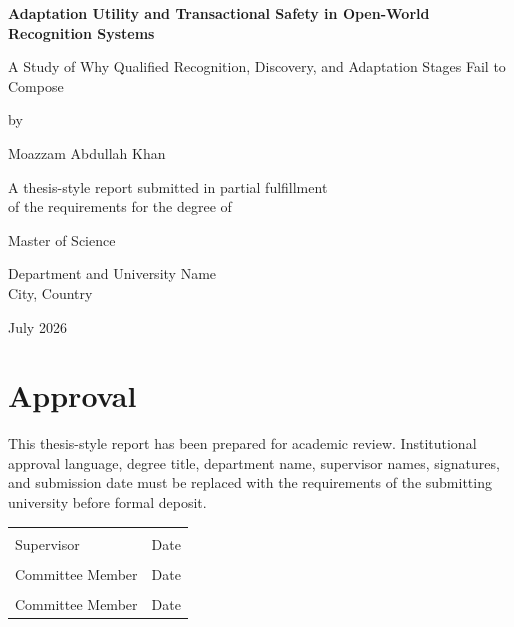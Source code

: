 \documentclass[12pt,oneside]{report}
\newcommand{\thesistitle}{Adaptation Utility and Transactional Safety in
Open-World Recognition Systems}
\begin{document}
\hypersetup{pageanchor=false}

\begin{titlepage}
\centering
\vspace*{0.8in}

{\Large\bfseries \thesistitle\par}
\vspace{0.3in}
{\large A Study of Why Qualified Recognition, Discovery, and Adaptation
Stages Fail to Compose\par}

\vspace{0.8in}

{\large by\par}
\vspace{0.15in}
{\Large Moazzam Abdullah Khan\par}

\vfill

A thesis-style report submitted in partial fulfillment\\
of the requirements for the degree of\\[0.15in]
{\large Master of Science\par}

\vspace{0.5in}

Department and University Name\\
City, Country

\vspace{0.5in}

July 2026
\end{titlepage}

\hypersetup{pageanchor=true}

\chapter*{Approval}

This thesis-style report has been prepared for academic review. Institutional
approval language, degree title, department name, supervisor names, signatures,
and submission date must be replaced with the requirements of the submitting
university before formal deposit.

\vspace{0.6in}

\begin{tabular}{p{2.3in}p{2.3in}}
\hrulefill & \hrulefill\\
Supervisor & Date\\[0.5in]
\hrulefill & \hrulefill\\
Committee Member & Date\\[0.5in]
\hrulefill & \hrulefill\\
Committee Member & Date
\end{tabular}
\end{document}
